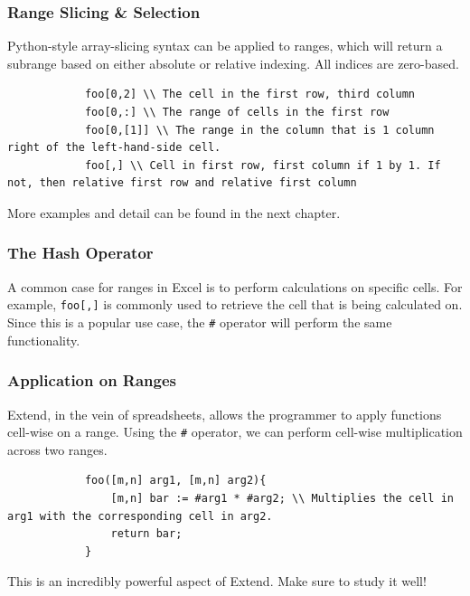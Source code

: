 		\subsubsection{Range Slicing \& Selection}
		Python-style array-slicing syntax can be applied to ranges, which will return a subrange based on either absolute or relative indexing. All indices are zero-based.

		\begin{lstlisting}
			foo[0,2] \\ The cell in the first row, third column
			foo[0,:] \\ The range of cells in the first row
			foo[0,[1]] \\ The range in the column that is 1 column right of the left-hand-side cell.
			foo[,] \\ Cell in first row, first column if 1 by 1. If not, then relative first row and relative first column
		\end{lstlisting}

		\medskip \noindent
		More examples and detail can be found in the next chapter.

		\subsubsection{The Hash Operator}
		A common case for ranges in Excel is to perform calculations on specific cells. For example, \texttt{foo[,]} is commonly used to retrieve the cell that is being calculated on.
		Since this is a popular use case, the \texttt{\#} operator will perform the same functionality.

		\subsubsection{Application on Ranges}
		Extend, in the vein of spreadsheets, allows the programmer to apply functions cell-wise on a range. Using the \texttt{\#} operator, we can perform cell-wise multiplication across two ranges.

		\begin{lstlisting}
			foo([m,n] arg1, [m,n] arg2){
				[m,n] bar := #arg1 * #arg2; \\ Multiplies the cell in arg1 with the corresponding cell in arg2.
				return bar;
			}
		\end{lstlisting}

		\medskip \noindent
		This is an incredibly powerful aspect of Extend. Make sure to study it well!

